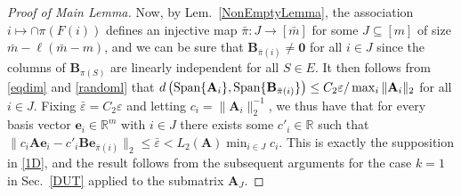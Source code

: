 \documentclass[9pt,twocolumn]{pnas-new}
\begin{document}
\begin{proof}[Proof of Main Lemma]
Now, by Lem.~\ref{NonEmptyLemma}, the association $i \mapsto \cap \pi(F(i))$ defines an injective map $\bar \pi: J \to [\bar m]$ for some $J \subseteq [m]$ of size $\bar m - \ell(\bar m - m)$, and we can be sure that $\mathbf{B}_{\bar \pi(i)} \neq \mathbf{0}$ for all $i \in J$ since the columns of $\mathbf{B}_{\pi(S)}$ are linearly independent for all $S \in E$. It then follows from \eqref{eqdim} and \eqref{randoml} that $d\left( \text{\rm Span}\{\mathbf{A}_i\}, \text{\rm Span}\{ \mathbf{B}_{\bar \pi(i)} \} \right) \leq C_2 \varepsilon / \max_i \|\mathbf{A}_i\|_2$ for all $i \in J$. Fixing $\bar \varepsilon = C_2\varepsilon$ and letting $c_i = \|\mathbf{A}_i\|_2^{-1}$, we thus have that for every basis vector $\mathbf{e}_i \in \mathbb{R}^m$ with $i \in J$ there exists some $c'_i \in \mathbb{R}$ such that $\|c_i\mathbf{A}\mathbf{e}_i - c'_i \mathbf{B}\mathbf{e}_{\bar \pi(i)}\|_2 \leq \bar \varepsilon < L_2(\mathbf{A}) \min_{i\in J} c_i$. This is exactly the supposition in \eqref{1D}, and the result follows from the subsequent arguments for the case $k=1$ in Sec.~\ref{DUT} applied to the submatrix $\mathbf{A}_J$.
\end{proof}

\end{document}

